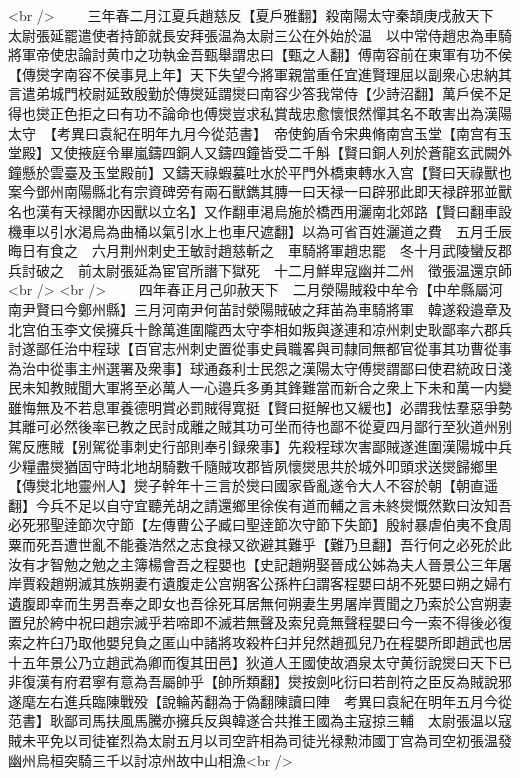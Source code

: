 <br />
　　三年春二月江夏兵趙慈反【夏戶雅翻】殺南陽太守秦頡庚戌赦天下　太尉張延罷遣使者持節就長安拜張温為太尉三公在外始於温　以中常侍趙忠為車騎將軍帝使忠論討黄巾之功執金吾甄舉謂忠曰【甄之人翻】傅南容前在東軍有功不侯【傳爕字南容不侯事見上年】天下失望今將軍親當重任宜進賢理屈以副衆心忠納其言遣弟城門校尉延致殷勤於傳爕延謂爕曰南容少答我常侍【少詩沼翻】萬戶侯不足得也爕正色拒之曰有功不論命也傅爕豈求私賞哉忠愈懷恨然憚其名不敢害出為漢陽太守　【考異曰袁紀在明年九月今從范書】　帝使鉤盾令宋典脩南宫玉堂【南宫有玉堂殿】又使掖庭令畢嵐鑄四銅人又鑄四鐘皆受二千斛【賢曰銅人列於蒼龍玄武闕外鐘懸於雲臺及玉堂殿前】又鑄天祿蝦蟇吐水於平門外橋東轉水入宫【賢曰天祿獸也案今鄧州南陽縣北有宗資碑旁有兩石獸鐫其膞一曰天禄一曰辟邪此即天禄辟邪並獸名也漢有天禄閣亦因獸以立名】又作翻車渇烏施於橋西用灑南北郊路【賢曰翻車設機車以引水渇烏為曲桶以氣引水上也車尺遮翻】以為可省百姓灑道之費　五月壬辰晦日有食之　六月荆州刺史王敏討趙慈斬之　車騎將軍趙忠罷　冬十月武陵蠻反郡兵討破之　前太尉張延為宦官所譖下獄死　十二月鮮卑寇幽并二州　徵張温還京師<br />
<br />
　　四年春正月己卯赦天下　二月滎陽賊殺中牟令【中牟縣屬河南尹賢曰今鄭州縣】三月河南尹何苖討滎陽賊破之拜苖為車騎將軍　韓遂殺邉章及北宫伯玉李文侯擁兵十餘萬進圍隴西太守李相如叛與遂連和凉州刺史耿鄙率六郡兵討遂鄙任治中程球【百官志州刺史置從事史員職畧與司隸同無都官從事其功曹從事為治中從事主州選署及衆事】球通姦利士民怨之漢陽太守傅爕謂鄙曰使君統政日淺民未知教賊聞大軍將至必萬人一心邉兵多勇其鋒難當而新合之衆上下未和萬一内變雖悔無及不若息軍養德明賞必罰賊得寛挺【賢曰挺解也又緩也】必謂我怯羣惡爭勢其離可必然後率已教之民討成離之賊其功可坐而待也鄙不從夏四月鄙行至狄道州别駕反應賊【别駕從事刺史行部則奉引録衆事】先殺程球次害鄙賊遂進圍漢陽城中兵少糧盡爕猶固守時北地胡騎數千隨賊攻郡皆夙懷爕思共於城外叩頭求送爕歸鄉里【傳爕北地靈州人】爕子幹年十三言於爕曰國家昏亂遂令大人不容於朝【朝直遥翻】今兵不足以自守宜聽羌胡之請還鄉里徐俟有道而輔之言未終爕慨然歎曰汝知吾必死邪聖逹節次守節【左傳曹公子臧曰聖逹節次守節下失節】殷紂暴虐伯夷不食周粟而死吾遭世亂不能養浩然之志食禄又欲避其難乎【難乃旦翻】吾行何之必死於此汝有才智勉之勉之主簿楊會吾之程嬰也【史記趙朔娶晉成公姊為夫人晉景公三年屠岸賈殺趙朔滅其族朔妻冇遺腹走公宫朔客公孫杵臼謂客程嬰曰胡不死嬰曰朔之婦冇遺腹即幸而生男吾奉之即女也吾徐死耳居無何朔妻生男屠岸賈聞之乃索於公宫朔妻置兒於絝中祝曰趙宗滅乎若啼即不滅若無聲及索兒竟無聲程嬰曰今一索不得後必復索之杵臼乃取他嬰兒負之匿山中諸將攻殺杵臼并兒然趙孤兒乃在程嬰所即趙武也居十五年景公乃立趙武為卿而復其田邑】狄道人王國使故酒泉太守黄衍說爕曰天下已非復漢有府君寧有意為吾屬帥乎【帥所類翻】爕按劍叱衍曰若剖符之臣反為賊說邪遂麾左右進兵臨陳戰殁【說輪芮翻為于偽翻陳讀曰陣　考異曰袁紀在明年五月今從范書】耿鄙司馬扶風馬騰亦擁兵反與韓遂合共推王國為主寇掠三輔　太尉張温以寇賊未平免以司徒崔烈為太尉五月以司空許相為司徒光禄勲沛國丁宫為司空初張温發幽州烏桓突騎三千以討凉州故中山相漁<br />
